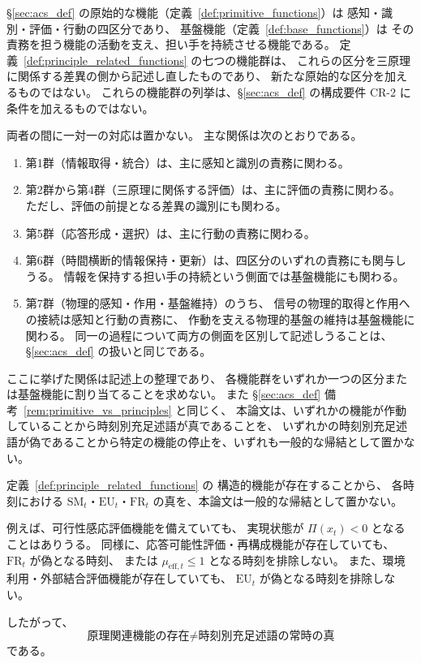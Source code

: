 \begin{remark}
\label{rem:primitive_vs_principle_functions}
\S\ref{sec:acs_def} の原始的な機能（定義~\ref{def:primitive_functions}）は
感知・識別・評価・行動の四区分であり、
基盤機能（定義~\ref{def:base_functions}）は
その責務を担う機能の活動を支え、担い手を持続させる機能である。
定義~\ref{def:principle_related_functions} の七つの機能群は、
これらの区分を三原理に関係する差異の側から記述し直したものであり、
新たな原始的な区分を加えるものではない。
これらの機能群の列挙は、\S\ref{sec:acs_def} の構成要件 CR-2 に条件を加えるものではない。

両者の間に一対一の対応は置かない。
主な関係は次のとおりである。
\begin{enumerate}
  \item 第1群（情報取得・統合）は、主に感知と識別の責務に関わる。
  \item 第2群から第4群（三原理に関係する評価）は、主に評価の責務に関わる。
  ただし、評価の前提となる差異の識別にも関わる。
  \item 第5群（応答形成・選択）は、主に行動の責務に関わる。
  \item 第6群（時間横断的情報保持・更新）は、四区分のいずれの責務にも関与しうる。
  情報を保持する担い手の持続という側面では基盤機能にも関わる。
  \item 第7群（物理的感知・作用・基盤維持）のうち、
  信号の物理的取得と作用への接続は感知と行動の責務に、
  作動を支える物理的基盤の維持は基盤機能に関わる。
  同一の過程について両方の側面を区別して記述しうることは、
  \S\ref{sec:acs_def} の扱いと同じである。
\end{enumerate}
ここに挙げた関係は記述上の整理であり、
各機能群をいずれか一つの区分または基盤機能に割り当てることを求めない。
また \S\ref{sec:acs_def} 備考~\ref{rem:primitive_vs_principles} と同じく、
本論文は、いずれかの機能が作動していることから時刻別充足述語が真であることを、
いずれかの時刻別充足述語が偽であることから特定の機能の停止を、いずれも一般的な帰結として置かない。
\end{remark}

\begin{remark}[三原理関連機能と時刻別充足述語の真の非同一性]
\label{rem:functions_not_principle_truth}
定義~\ref{def:principle_related_functions} の
構造的機能が存在することから、
各時刻における $\mathrm{SM}_t$・$\mathrm{EU}_t$・$\mathrm{FR}_t$ の真を、本論文は一般的な帰結として置かない。

例えば、可行性感応評価機能を備えていても、
実現状態が $\Pi(x_t)<0$ となることはありうる。
同様に、応答可能性評価・再構成機能が存在していても、
$\mathrm{FR}_t$ が偽となる時刻、
または $\mu_{\mathrm{eff},t}\le1$ となる時刻を排除しない。
また、環境利用・外部結合評価機能が存在していても、
$\mathrm{EU}_t$ が偽となる時刻を排除しない。

したがって、
\[
  \text{原理関連機能の存在}
  \neq
  \text{時刻別充足述語の常時の真}
\]
である。
\end{remark}

